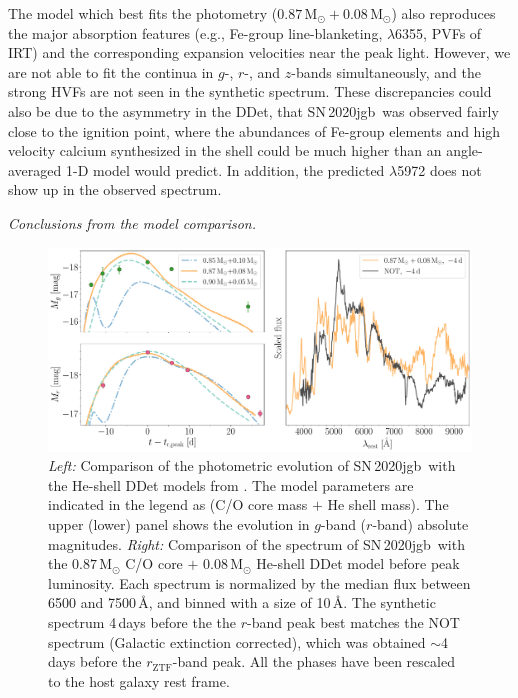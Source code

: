 \documentclass[twocolumn]{aastex631}
\newcommand{\sn}{SN\,2020jgb}
\begin{document}
The model which best fits the photometry ($0.87\,\mathrm{M_\odot}+0.08\,\mathrm{M_\odot}$) also reproduces the major absorption features (e.g., Fe-group line-blanketing,  $\lambda$6355, PVFs of  IRT) and the corresponding expansion velocities near the peak light. 
However, we are not able to fit the continua in $g$-, $r$-, and $z$-bands simultaneously, and the strong  HVFs are not seen in the synthetic spectrum. These discrepancies could also be due to the asymmetry in the DDet, that \sn\ was observed fairly close to the ignition point, where the abundances of Fe-group elements and high velocity calcium synthesized in the shell could be much higher than an angle-averaged 1-D model would predict.
In addition, the predicted  $\lambda$5972 does not show up in the observed spectrum.

{\it Conclusions from the model comparison.}

\begin{figure}
    \centering
    \includegraphics[width=\textwidth]{model.pdf}
    \caption{{\it Left:} Comparison of the photometric evolution of \sn\ with the He-shell DDet models from \citet{polin_observational_2019}. The model parameters are indicated in the legend as (C/O core mass $+$ He shell mass). The upper (lower) panel shows the evolution in $g$-band ($r$-band) absolute magnitudes. {\it Right:} Comparison of the spectrum of \sn\ with the $0.87\,\mathrm{M_\odot}$ C/O core $+$ $0.08\,\mathrm{M_\odot}$ He-shell DDet model before peak luminosity. Each spectrum is normalized by the median flux between 6500 and 7500\,\AA, and binned with a size of 10\,\AA. The synthetic spectrum 4\,days before the the $r$-band peak best matches the NOT spectrum (Galactic extinction corrected), which was obtained $\sim$4\,days before the $r_\mathrm{ZTF}$-band peak. All the phases have been rescaled to the host galaxy rest frame.}
    \label{fig:model}
\end{figure}
\end{document}
